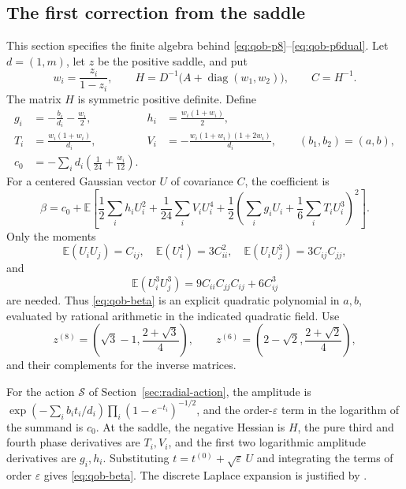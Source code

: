 \documentclass[11pt,reqno]{amsart}
\theoremstyle{remark}
\numberwithin{equation}{section}
\begin{document}
\subsection{The first correction from the saddle}\label{app:quad-formula}
This section specifies the finite algebra behind
\eqref{eq:qob-p8}--\eqref{eq:qob-p6dual}. Let $d=(1,m)$, let $z$ be the positive
saddle, and put
\[
 w_i=\frac{z_i}{1-z_i},\qquad
 H=D^{-1}\bigl(A+\operatorname{diag}(w_1,w_2)\bigr),\qquad C=H^{-1}.
\]
The matrix $H$ is symmetric positive definite. Define
\begin{align*}
 g_i&=-\frac{b_i}{d_i}-\frac{w_i}{2},&
 h_i&=\frac{w_i(1+w_i)}2,\\
 T_i&=\frac{w_i(1+w_i)}{d_i},&
 V_i&=-\frac{w_i(1+w_i)(1+2w_i)}{d_i},\qquad (b_1,b_2)=(a,b),\\
 c_0&=-\sum_i d_i\left(\frac1{24}+\frac{w_i}{12}\right).
\end{align*}
For a centered Gaussian vector $U$ of covariance $C$, the coefficient is
\begin{equation}\label{eq:qob-beta}
 \beta=c_0+\mathbb E\left[
 \frac12\sum_i h_iU_i^2+\frac1{24}\sum_i V_iU_i^4
 +\frac12\left(\sum_i g_iU_i+\frac16\sum_i T_iU_i^3\right)^2
 \right].
\end{equation}
Only the moments
\[
 \mathbb E(U_iU_j)=C_{ij},\quad \mathbb E(U_i^4)=3C_{ii}^2,\quad
 \mathbb E(U_iU_j^3)=3C_{ij}C_{jj},
\]
and
\[
 \mathbb E(U_i^3U_j^3)=9C_{ii}C_{jj}C_{ij}+6C_{ij}^3
\]
are needed. Thus \eqref{eq:qob-beta} is an explicit quadratic polynomial in
$a,b$, evaluated by rational arithmetic in the indicated quadratic field.
Use
\[
 z^{(8)}=\left(\sqrt3-1,\frac{2+\sqrt3}{4}\right),\qquad
 z^{(6)}=\left(2-\sqrt2,\frac{2+\sqrt2}{4}\right),
\]
and their complements for the inverse matrices.

For the action $\mathcal S$ of Section~\ref{sec:radial-action}, the
amplitude is
$\exp(-\sum_i b_it_i/d_i)\prod_i(1-e^{-t_i})^{-1/2}$, and the
order-$\varepsilon$ term in the logarithm of the summand is $c_0$.
At the saddle, the negative Hessian is $H$, the pure third and fourth
phase derivatives are $T_i,V_i$, and the first two logarithmic amplitude
derivatives are $g_i,h_i$. Substituting
$t=t^{(0)}+\sqrt\varepsilon\,U$ and integrating the terms of order
$\varepsilon$ gives \eqref{eq:qob-beta}. The discrete Laplace expansion
is justified by \cite[Section~2]{Mizuno}.
\end{document}
